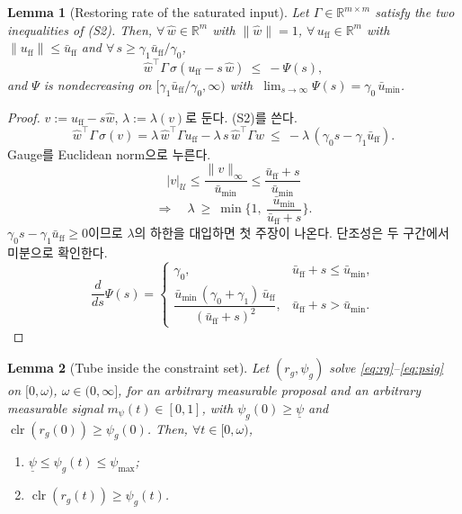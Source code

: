 \documentclass[11pt]{article}\usepackage[margin=1in]{geometry}\usepackage{amsmath,amssymb,amsthm,mathtools}\usepackage{graphicx}\graphicspath{{figures/}{../figures/}{figs/}{./}}\usepackage{enumitem}\usepackage{hyperref}\usepackage{cleveref}\usepackage{tikz}\usetikzlibrary{arrows.meta,positioning,calc,shapes.geometric}\usepackage{float}\usepackage[most]{tcolorbox}\usepackage{kotex}\usepackage{booktabs}\emergencystretch=1.6em\tolerance=2000 \crefname{assumption}{Assumption}{Assumptions}\Crefname{assumption}{Assumption}{Assumptions}\crefname{definition}{Definition}{Definitions}\Crefname{definition}{Definition}{Definitions}\crefname{proposition}{Proposition}{Propositions}\Crefname{proposition}{Proposition}{Propositions}\crefname{fact}{Fact}{Facts}\Crefname{fact}{Fact}{Facts} \newtheorem{assumption}{Assumption}\newtheorem{definition}{Definition}\newtheorem{lemma}{Lemma}\newtheorem{proposition}{Proposition}\newtheorem{theorem}{Theorem}\newtheorem{corollary}{Corollary}\newtheorem{fact}{Fact}\theoremstyle{remark}\newtheorem{remark}{Remark} \newcommand{\R}{\mathbb{R}}\newcommand{\U}{\mathcal U}
\DeclareMathOperator{\clr}{clr}\newcommand{\norm}[1]{\lVert #1\rVert}\newcommand{\what}{\hat w}
\begin{document}
\begin{lemma}[Restoring rate of the saturated input]
\label{lem:restore}
Let $\Gamma\in\R^{m\times m}$ satisfy the two inequalities of (S2). Then, $\forall\,\what\in\R^m$ with $\norm{\what}=1$, $\forall\,u_{\mathrm{ff}}\in\R^m$ with $\norm{u_{\mathrm{ff}}}\le\bar u_{\mathrm{ff}}$ and $\forall\,s\ge\gamma_1\bar u_{\mathrm{ff}}/\gamma_0$,
\[
\what^\top\Gamma\,\sigma(u_{\mathrm{ff}}-s\,\what)\ \le\ -\Psi(s),
\]
and $\Psi$ is nondecreasing on $[\gamma_1\bar u_{\mathrm{ff}}/\gamma_0,\infty)$ with $\ \lim_{s\to\infty}\Psi(s)=\gamma_0\,\bar u_{\min}$.
\end{lemma}

\begin{proof}
$v:=u_{\mathrm{ff}}-s\what$, $\lambda:=\lambda(v)$로 둔다. (S2)를 쓴다.
\[
\what^\top\Gamma\,\sigma(v)=\lambda\,\what^\top\Gamma u_{\mathrm{ff}}-\lambda\,s\,\what^\top\Gamma\what\ \le\ -\lambda\,(\gamma_0 s-\gamma_1\bar u_{\mathrm{ff}}).
\]
Gauge를 Euclidean norm으로 누른다.
\[
|v|_{\U}\le\frac{\norm{v}_\infty}{\bar u_{\min}}\le\frac{\bar u_{\mathrm{ff}}+s}{\bar u_{\min}}
\]
\[
\Longrightarrow\quad \lambda\ \ge\ \min\Big\{1,\ \frac{\bar u_{\min}}{\bar u_{\mathrm{ff}}+s}\Big\}.
\]
$\gamma_0s-\gamma_1\bar u_{\mathrm{ff}}\ge0$이므로 $\lambda$의 하한을 대입하면 첫 주장이 나온다. 단조성은 두 구간에서 미분으로 확인한다.
\[
\frac{d}{ds}\Psi(s)=
\begin{cases}
\gamma_0, & \bar u_{\mathrm{ff}}+s\le\bar u_{\min},\\[2pt]
\dfrac{\bar u_{\min}\,(\gamma_0+\gamma_1)\,\bar u_{\mathrm{ff}}}{(\bar u_{\mathrm{ff}}+s)^2}, & \bar u_{\mathrm{ff}}+s>\bar u_{\min}.
\end{cases}
\]
\end{proof}

\begin{lemma}[Tube inside the constraint set]
\label{lem:tube}
Let $(r_g,\psi_g)$ solve \eqref{eq:rg}--\eqref{eq:psig} on $[0,\omega)$, $\omega\in(0,\infty]$, for an arbitrary measurable proposal and an arbitrary measurable signal $m_\psi(t)\in[0,1]$, with $\psi_g(0)\ge\underline\psi$ and $\clr(r_g(0))\ge\psi_g(0)$. Then, $\forall t\in[0,\omega)$,
\begin{enumerate}[label=(\alph*)]
\item $\underline\psi\le\psi_g(t)\le\psi_{\max}$;
\item $\clr(r_g(t))\ge\psi_g(t)$.
\end{enumerate}
\end{lemma}
\end{document}
